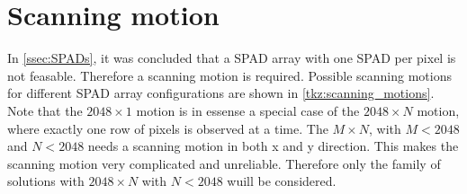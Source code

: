 \section{Scanning motion}\label{ssec:scanning_motion}
In \cref{ssec:SPADs}, it was concluded that a SPAD array with one SPAD per pixel is not feasable. Therefore a scanning motion is required. Possible scanning motions for different SPAD array configurations are shown in \cref{tkz:scanning_motions}. Note that the $2048\times1$ motion is in essense a special case of the $2048\times N$ motion, where exactly one row of pixels is observed at a time. The $M\times N$, with $M<2048$ and $N<2048$ needs a scanning motion in both x and y direction. This makes the scanning motion very complicated and unreliable. Therefore only the family of solutions with $2048\times N$ with $N<2048$ wuill be considered.



